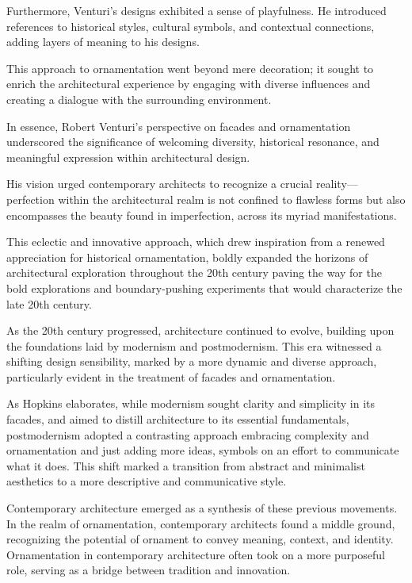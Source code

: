 Furthermore, Venturi's designs exhibited a sense of playfulness.
He introduced references to historical styles, cultural symbols, and contextual connections, adding layers of meaning to his designs.

This approach to ornamentation went beyond mere decoration;
it sought to enrich the architectural experience by engaging with diverse influences and creating a dialogue with the surrounding environment.

In essence, Robert Venturi's perspective on facades and ornamentation underscored the significance of welcoming diversity, historical resonance, and meaningful expression within architectural design.

His vision urged contemporary architects to recognize a crucial reality—perfection within the architectural realm is not confined to flawless forms but also encompasses the beauty found in imperfection, across its myriad manifestations\cite{Lutolli2020}.

This eclectic and innovative approach, which drew inspiration from a renewed appreciation for historical ornamentation, boldly expanded the horizons of architectural exploration throughout the 20th century\cite{Stamp2016} paving the way for the bold explorations and boundary-pushing experiments that would characterize the late 20th century.

As the 20th century progressed, architecture continued to evolve, building upon the foundations laid by modernism and postmodernism.
This era witnessed a shifting design sensibility, marked by a more dynamic and diverse approach, particularly evident in the treatment of facades and ornamentation.

As Hopkins\cite{Hopkins2020} elaborates, while modernism sought clarity and simplicity in its facades, and aimed to distill architecture to its essential fundamentals, postmodernism adopted a contrasting approach embracing complexity and ornamentation and just adding more ideas, symbols on an effort to communicate what it does.
This shift marked a transition from abstract and minimalist aesthetics to a more descriptive and communicative style.

Contemporary architecture emerged as a synthesis of these previous movements.
In the realm of ornamentation, contemporary architects found a middle ground, recognizing the potential of ornament to convey meaning, context, and identity.
Ornamentation in contemporary architecture often took on a more purposeful role, serving as a bridge between tradition and innovation.

